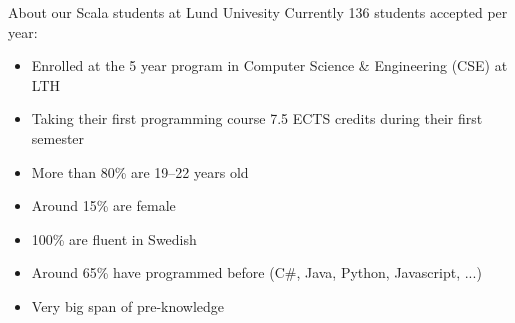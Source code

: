 \documentclass[aspectratio=169]{beamer}
\newenvironment{Slide}[1]%
  {\begin{frame}[environment=Slide]{#1}}
  {\end{frame}}%
\begin{document}
\begin{frame}[plain]
  \begin{figure}
  \centering
  \end{figure}%
  \end{frame}%

\begin{Slide}{About our Scala students at Lund Univesity}
Currently 136 students accepted per year:
\begin{itemize}
\item Enrolled at the 5 year program in Computer Science \& Engineering (CSE) at LTH
\item Taking their first programming course 7.5 ECTS credits during their first semester
\item More than 80\% are 19--22 years old
\item Around 15\% are female     
\item 100\% are fluent in Swedish
\item Around 65\% have programmed before (C\#, Java, Python, Javascript, ...)
\item Very big span of pre-knowledge
\end{itemize}
\end{Slide}
\end{document}
